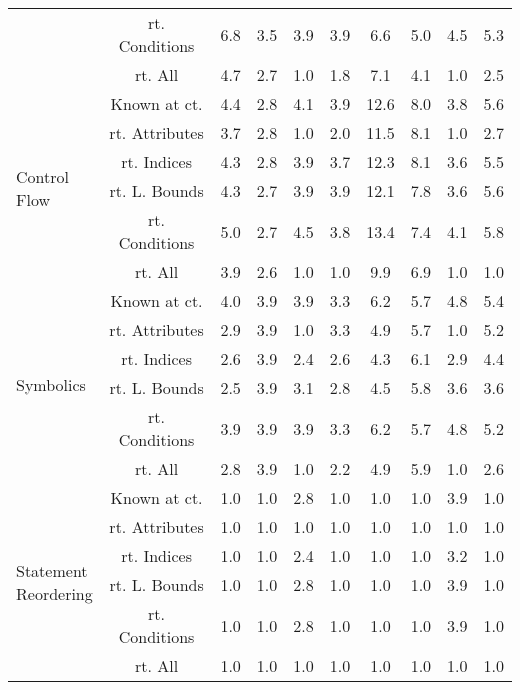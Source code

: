 \documentclass{article}
\begin{document}
\begin{longtable}{|p{2cm}|c|c|c|c|c|c|c|c|c|}
 & rt. Conditions & 6.8 & 3.5 & 3.9 & 3.9 & 6.6 & 5.0 & 4.5 & 5.3\\ \cline{2-10}
 & rt. All & 4.7 & 2.7 & 1.0 & 1.8 & 7.1 & 4.1 & 1.0 & 2.5\\ \cline{2-10}
\hline
\multirow{6}{*}{ \parbox{2cm}{Control\\Flow}} & Known at ct. & 4.4 & 2.8 & 4.1 & 3.9 & 12.6 & 8.0 & 3.8 & 5.6\\ \cline{2-10}
 & rt. Attributes & 3.7 & 2.8 & 1.0 & 2.0 & 11.5 & 8.1 & 1.0 & 2.7\\ \cline{2-10}
 & rt. Indices & 4.3 & 2.8 & 3.9 & 3.7 & 12.3 & 8.1 & 3.6 & 5.5\\ \cline{2-10}
 & rt. L. Bounds & 4.3 & 2.7 & 3.9 & 3.9 & 12.1 & 7.8 & 3.6 & 5.6\\ \cline{2-10}
 & rt. Conditions & 5.0 & 2.7 & 4.5 & 3.8 & 13.4 & 7.4 & 4.1 & 5.8\\ \cline{2-10}
 & rt. All & 3.9 & 2.6 & 1.0 & 1.0 & 9.9 & 6.9 & 1.0 & 1.0\\ \cline{2-10}
\hline
\multirow{6}{*}{ \parbox{2cm}{Symbolics}} & Known at ct. & 4.0 & 3.9 & 3.9 & 3.3 & 6.2 & 5.7 & 4.8 & 5.4\\ \cline{2-10}
 & rt. Attributes & 2.9 & 3.9 & 1.0 & 3.3 & 4.9 & 5.7 & 1.0 & 5.2\\ \cline{2-10}
 & rt. Indices & 2.6 & 3.9 & 2.4 & 2.6 & 4.3 & 6.1 & 2.9 & 4.4\\ \cline{2-10}
 & rt. L. Bounds & 2.5 & 3.9 & 3.1 & 2.8 & 4.5 & 5.8 & 3.6 & 3.6\\ \cline{2-10}
 & rt. Conditions & 3.9 & 3.9 & 3.9 & 3.3 & 6.2 & 5.7 & 4.8 & 5.2\\ \cline{2-10}
 & rt. All & 2.8 & 3.9 & 1.0 & 2.2 & 4.9 & 5.9 & 1.0 & 2.6\\ \cline{2-10}
\hline
\multirow{6}{*}{ \parbox{2cm}{Statement\\Reordering}} & Known at ct. & 1.0 & 1.0 & 2.8 & 1.0 & 1.0 & 1.0 & 3.9 & 1.0\\ \cline{2-10}
 & rt. Attributes & 1.0 & 1.0 & 1.0 & 1.0 & 1.0 & 1.0 & 1.0 & 1.0\\ \cline{2-10}
 & rt. Indices & 1.0 & 1.0 & 2.4 & 1.0 & 1.0 & 1.0 & 3.2 & 1.0\\ \cline{2-10}
 & rt. L. Bounds & 1.0 & 1.0 & 2.8 & 1.0 & 1.0 & 1.0 & 3.9 & 1.0\\ \cline{2-10}
 & rt. Conditions & 1.0 & 1.0 & 2.8 & 1.0 & 1.0 & 1.0 & 3.9 & 1.0\\ \cline{2-10}
 & rt. All & 1.0 & 1.0 & 1.0 & 1.0 & 1.0 & 1.0 & 1.0 & 1.0\\ \cline{2-10}

\end{longtable}
\end{document}
